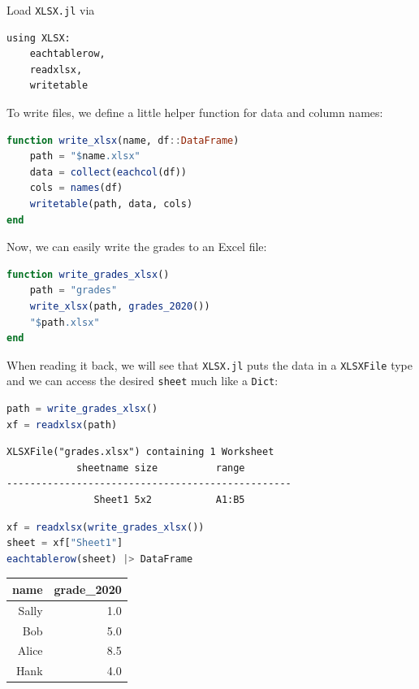 \documentclass[
  notoc %
]{tufte-book}
\newcommand{\passthrough}[1]{#1}
\begin{document}
Load \passthrough{\lstinline!XLSX.jl!} via

\begin{lstlisting}
using XLSX:
    eachtablerow,
    readxlsx,
    writetable
\end{lstlisting}

To write files, we define a little helper function for data and column
names:

\begin{lstlisting}[language=Julia]
function write_xlsx(name, df::DataFrame)
    path = "$name.xlsx"
    data = collect(eachcol(df))
    cols = names(df)
    writetable(path, data, cols)
end
\end{lstlisting}

Now, we can easily write the grades to an Excel file:

\begin{lstlisting}[language=Julia]
function write_grades_xlsx()
    path = "grades"
    write_xlsx(path, grades_2020())
    "$path.xlsx"
end
\end{lstlisting}

When reading it back, we will see that \passthrough{\lstinline!XLSX.jl!}
puts the data in a \passthrough{\lstinline!XLSXFile!} type and we can
access the desired \passthrough{\lstinline!sheet!} much like a
\passthrough{\lstinline!Dict!}:

\begin{lstlisting}[language=Julia]
path = write_grades_xlsx()
xf = readxlsx(path)
\end{lstlisting}

\begin{lstlisting}[language=Output]
XLSXFile("grades.xlsx") containing 1 Worksheet
            sheetname size          range        
-------------------------------------------------
               Sheet1 5x2           A1:B5        

\end{lstlisting}

\begin{lstlisting}[language=Julia]
xf = readxlsx(write_grades_xlsx())
sheet = xf["Sheet1"]
eachtablerow(sheet) |> DataFrame
\end{lstlisting}

\begin{longtable}[]{@{}rr@{}}
\toprule
name & grade\_2020 \\
\midrule
\endhead
Sally & 1.0 \\
Bob & 5.0 \\
Alice & 8.5 \\
Hank & 4.0 \\
\bottomrule
\end{longtable}
\end{document}
